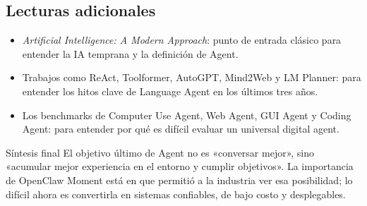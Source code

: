 \subsection{Lecturas adicionales}

\begin{itemize}
\item \textit{Artificial Intelligence: A Modern Approach}: punto de entrada clásico para entender la IA temprana y la definición de Agent.
\item Trabajos como ReAct, Toolformer, AutoGPT, Mind2Web y LM Planner: para entender los hitos clave de Language Agent en los últimos tres años.
\item Los benchmarks de Computer Use Agent, Web Agent, GUI Agent y Coding Agent: para entender por qué es difícil evaluar un universal digital agent.
\end{itemize}

\begin{importantbox}{Síntesis final}
El objetivo último de Agent no es «conversar mejor», sino «acumular mejor experiencia en el entorno y cumplir objetivos». La importancia de OpenClaw Moment está en que permitió a la industria ver esa posibilidad; lo difícil ahora es convertirla en sistemas confiables, de bajo costo y desplegables.
\end{importantbox}


